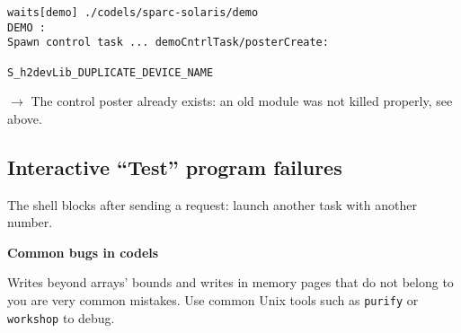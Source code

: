 \begin{center}\begin{cartouche}\small\begin{verbatim}
waits[demo] ./codels/sparc-solaris/demo
DEMO :
Spawn control task ... demoCntrlTask/posterCreate:
                                              S_h2devLib_DUPLICATE_DEVICE_NAME
\end{verbatim}\end{cartouche}\end{center}

$\rightarrow$ The  control poster already  exists: an  old module was not
killed properly, see above.


\subsection{Interactive ``Test'' program failures}

The shell  blocks   after sending  a  request: launch  another  task with
another number.



\bigbreak
\textbf{Common bugs in codels}

Writes beyond  arrays'  bounds and  writes  in memory  pages  that do not
belong to you are  very common mistakes.   Use common Unix tools such  as
\texttt{purify} or \texttt{workshop} to debug.
